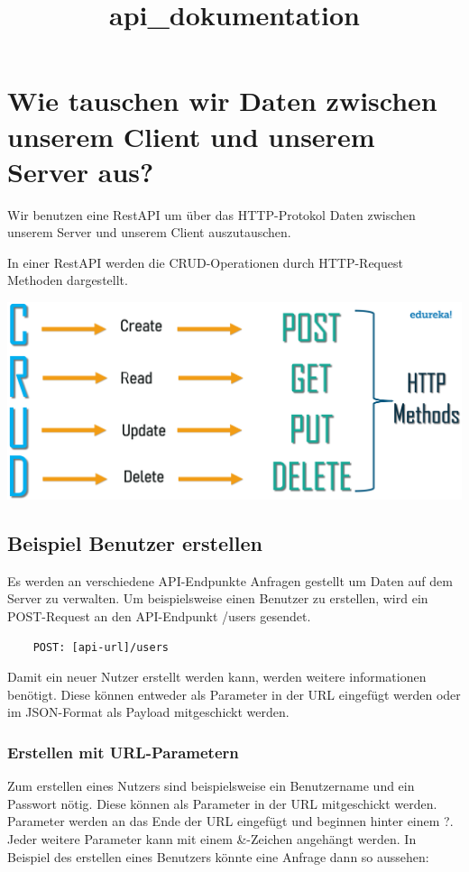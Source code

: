 \documentclass{article}
\title{api_dokumentation}
\begin{document}
\section{Wie tauschen wir Daten zwischen unserem Client und unserem Server aus?}
Wir benutzen eine RestAPI um über das HTTP-Protokol Daten 
zwischen unserem Server und unserem Client auszutauschen.

In einer RestAPI werden die CRUD-Operationen durch 
HTTP-Request Methoden dargestellt.

\includegraphics[width=\textwidth]{crud_to_http.png}

\subsection{Beispiel Benutzer erstellen}

Es werden an verschiedene API-Endpunkte Anfragen gestellt um Daten auf dem Server zu verwalten.
Um beispielsweise einen Benutzer zu erstellen, wird ein POST-Request an den API-Endpunkt /users gesendet.

\begin{verbatim}
    POST: [api-url]/users
\end{verbatim}

Damit ein neuer Nutzer erstellt werden kann, werden weitere informationen benötigt.
Diese können entweder als Parameter in der URL eingefügt werden oder im JSON-Format als Payload
mitgeschickt werden.

\subsubsection{Erstellen mit URL-Parametern}
Zum erstellen eines Nutzers sind beispielsweise ein Benutzername und ein Passwort nötig. Diese können als
Parameter in der URL mitgeschickt werden. Parameter werden an das Ende der URL eingefügt und beginnen hinter 
einem ?. Jeder weitere Parameter kann mit einem \&-Zeichen angehängt werden. In Beispiel des erstellen eines
Benutzers könnte eine Anfrage dann so aussehen:
\end{document}
